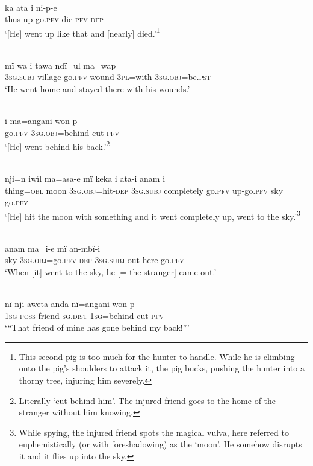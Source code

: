 \\
\gll ka    ata  i    ni-p-e\\
thus  up  go.\textsc{pfv}  die-\textsc{pfv-dep}\\
\glt ‘[He] went up like that and [nearly] died.’\footnote{This second pig is too much for the hunter to handle. While he is climbing onto the pig’s shoulders to attack it, the pig bucks, pushing the hunter into a thorny tree, injuring him severely.}

\\
\gll mï      wa    i    tawa  ndï=ul    ma=wap\\
3\textsc{sg.subj}  village  go.\textsc{pfv}  wound  3\textsc{pl}=with  3\textsc{sg.obj}=be.\textsc{pst}\\
\glt ‘He went home and stayed there with his wounds.’

\\
\gll i    ma=angani    won-p\\
go.\textsc{pfv}  3\textsc{sg.obj}=behind  cut-\textsc{pfv}\\
\glt ‘[He] went behind his back.’\footnote{Literally ‘cut behind him’. The injured friend goes to the home of the stranger without him knowing.}

\\
\gll nji=n    iwïl  ma=asa-e      mï      keka      i ata-i    anam  i\\
thing=\textsc{obl}  moon  3\textsc{sg.obj}=hit-\textsc{dep}  3\textsc{sg.subj}  completely  go.\textsc{pfv} up-go.\textsc{pfv}  sky    go.\textsc{pfv}\\
\glt ‘[He] hit the moon with something and it went completely up, went to the sky.’\footnote{While spying, the injured friend spots the magical vulva, here referred to euphemistically (or with foreshadowing) as the ‘moon’. He somehow disrupts it and it flies up into the sky.}

\\
\gll anam  ma=i-e          mï      an-mbï-i\\
sky    3\textsc{sg.obj}=go.\textsc{pfv-dep}  3\textsc{sg.subj}  out-here-go.\textsc{pfv}\\
\glt ‘When [it] went to the sky, he [= the stranger] came out.’

\\
\gll nï-nji    aweta  anda    nï=angani    won-p\\
1\textsc{sg-poss}  friend  \textsc{sg.dist}  1\textsc{sg}=behind  cut-\textsc{pfv}\\
\glt ‘“That friend of mine has gone behind my back!”’

